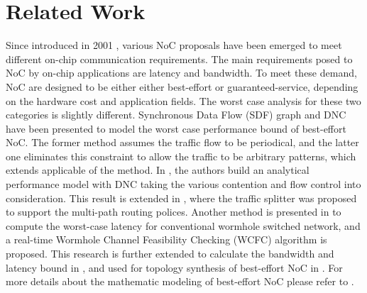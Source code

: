 \documentclass[10pt,journal]{IEEEtran}
\begin{document}
\section{Related Work}\label{related}
Since introduced in 2001 \cite{DaTo01}, various NoC proposals have been emerged to meet different on-chip communication requirements. The main requirements posed to NoC by on-chip applications are latency and bandwidth. To meet these demand, NoC are designed to be either either best-effort or guaranteed-service, depending on the hardware cost and application fields. The worst case analysis for these two categories is slightly different. Synchronous Data Flow (SDF) graph \cite{poplavko2003task} and DNC \cite{qian2009analysis} have been presented to model the worst case performance bound of best-effort NoC. The former method assumes the traffic flow to be periodical, and the latter one eliminates this constraint to allow the traffic to be arbitrary patterns, which extends applicable of the method. In \cite{qian2009analysis}, the authors build an analytical performance model with DNC taking the various contention and flow control into consideration. This result is extended in \cite{Du:2012:WPA:2380445.2380469}, where the traffic splitter was proposed to support the multi-path routing polices. Another method is presented in \cite{Lee:2003:RWC:846077.846083} to compute the worst-case latency for conventional wormhole switched network, and a real-time Wormhole Channel Feasibility Checking (WCFC) algorithm is proposed. This research is further extended to calculate the bandwidth and latency bound in \cite{6109240}, and used for topology synthesis of best-effort NoC in \cite{EPFL-ARTICLE-186879}. For more details about the mathematic modeling of best-effort NoC please refer to \cite{Kiasari:2013:MFP:2480741.2480755}.
\end{document}
